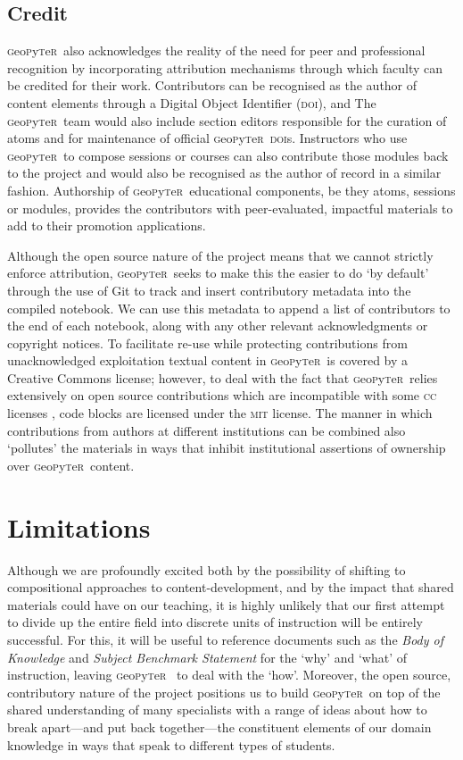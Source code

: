 \documentclass[letter, 11pt,titlepage]{article}
\newcommand{\gp}{\textsc{g}eo\textsc{p}y\textsc{t}e\textsc{r}~\/}
\begin{document}
\subsection{Credit}

\gp also acknowledges the reality of the need for peer and professional recognition by incorporating attribution mechanisms through which faculty can be credited for their work. Contributors can be recognised as the author of content elements through a Digital Object Identifier (\textsc{doi}), and The \gp team would also include section editors responsible for the curation of atoms and for maintenance of official \gp \textsc{doi}s. Instructors who use \gp to compose sessions or courses can also contribute those modules back to the project and would also be recognised as the author of record in a similar fashion. Authorship of \gp educational components, be they atoms, sessions or modules, provides the contributors with peer-evaluated, impactful materials to add to their promotion applications.

Although the open source nature of the project means that we cannot strictly
enforce attribution, \gp seeks to make this the easier to do `by default'
through the use of Git to track and insert contributory metadata into the
compiled notebook. We can use this metadata to append a list of contributors to
the end of each notebook, along with any other relevant acknowledgments or
copyright notices. To facilitate re-use while protecting contributions from
unacknowledged exploitation textual content in \gp is covered by a Creative
Commons license; however, to deal with the fact that \gp relies extensively on
open source contributions which are incompatible with some \textsc{cc} licenses
\citep[see discussion in][]{osswatch2013}, code blocks are licensed under the
\textsc{mit} license. The manner in which contributions from authors at
different institutions can be combined also `pollutes' the materials in ways
that inhibit institutional assertions of ownership over \gp content.

\section{Limitations}\label{limitations}

Although we are profoundly excited both by the possibility of shifting to
compositional approaches to content-development, and by the impact that shared
materials could have on our teaching, it is highly unlikely that our first
attempt to divide up the entire field into discrete units of instruction will be
entirely successful. For this, it will be useful to reference documents such as
the \textit{Body of Knowledge} \citep{bok2018} and \textit{Subject Benchmark
Statement} \citep{QAA2014} for the `why' and `what' of instruction, leaving \gp
to deal with the `how'. Moreover, the open source, contributory nature of the
project positions us to build \gp on top of the shared understanding of many
specialists with a range of ideas about how to break apart---and put back
together---the constituent elements of our domain knowledge in ways that speak
to different types of students.
\end{document}
